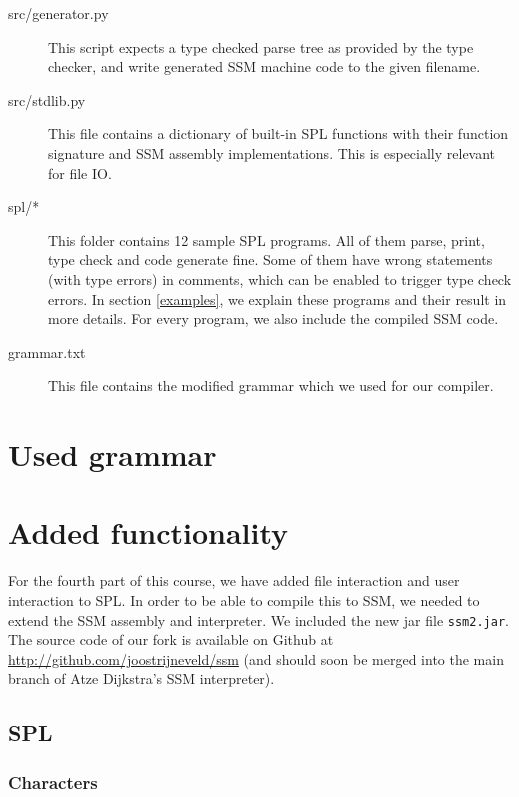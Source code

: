\documentclass[a4paper]{article}
\begin{document}
\begin{description}
        \item[src/generator.py] This script expects a type checked parse tree as provided by the type checker, and write generated SSM machine code to the given filename. 
  \item[src/stdlib.py] This file contains a dictionary of built-in SPL functions with their function signature and SSM assembly implementations. This is especially relevant for file IO. 
        \item[spl/*] This folder contains 12 sample SPL programs. All of them parse, print, type check and code generate fine. Some of them have wrong statements (with type errors) in comments, which can be enabled to trigger type check errors. In section \ref{examples}, we explain these programs and their result in more details. For every program, we also include the compiled SSM code. 
        \item[grammar.txt] This file contains the modified grammar which we used for our compiler.
\end{description}

\newpage
\section{Used grammar}


\newpage
\section{Added functionality}
\label{part4}
For the fourth part of this course, we have added file interaction and user interaction to SPL. In order to be able to compile this to SSM, we needed to extend the SSM assembly and interpreter. We included the new jar file {\tt ssm2.jar}. The source code of our fork is available on Github at \url{http://github.com/joostrijneveld/ssm} (and should soon be merged into the main branch of Atze Dijkstra's SSM interpreter).

\subsection{SPL}

\subsubsection{Characters}
\end{document}
